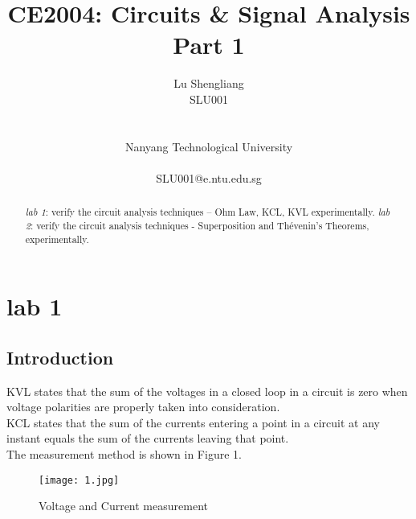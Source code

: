 \documentclass[12pt,fleqn]{article}
\title{CE2004: Circuits \& Signal Analysis Part 1}
\author{
  Lu Shengliang \\
  SLU001\\
  \Organization{} \\
  \vspace*{-10mm} \\
  Nanyang Technological University \\
  \vspace*{-10mm} \\
  SLU001@e.ntu.edu.sg
}
\begin{document}
\maketitle

\begin{abstract}
\emph{lab 1}: verify the circuit analysis techniques – Ohm Law, KCL, KVL experimentally. \emph{lab 2}: verify the circuit analysis techniques - Superposition and Thévenin’s Theorems, experimentally.
\end{abstract}


\section{lab 1}
\subsection{Introduction}
KVL states that the sum of the voltages in a closed loop in a circuit is zero when voltage polarities are properly taken into consideration. \\
KCL states that the sum of the currents entering a point in a circuit at any instant equals the sum of the currents leaving that point. \\
The measurement method is shown in Figure 1.\\
\begin{figure}[H]
\centering
\texttt{[image: 1.jpg]}
\caption{Voltage and Current measurement}
\end{figure}
\end{document}
